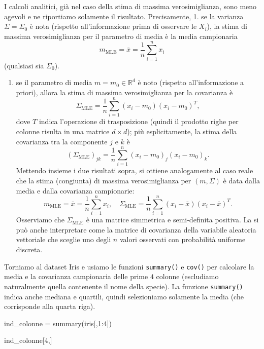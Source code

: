 \documentclass[
  italian,
  letterpaper,
]{book}
\newenvironment{Shaded}{\begin{snugshade}}{\end{snugshade}}
\newcommand{\DecValTok}[1]{\textcolor[rgb]{0.68,0.00,0.00}{#1}}
\newcommand{\FunctionTok}[1]{\textcolor[rgb]{0.28,0.35,0.67}{#1}}
\newcommand{\NormalTok}[1]{\textcolor[rgb]{0.00,0.23,0.31}{#1}}
\newcommand{\OtherTok}[1]{\textcolor[rgb]{0.00,0.23,0.31}{#1}}
\newcommand{\SpecialCharTok}[1]{\textcolor[rgb]{0.37,0.37,0.37}{#1}}
\providecommand{\tightlist}{%
  \setlength{\itemsep}{0pt}\setlength{\parskip}{0pt}}
\newcommand{\R}{\mathbb{R}}
\newcommand{\mle}{\operatorname{MLE}}
\theoremstyle{definition}
\theoremstyle{remark}
\begin{document}
I calcoli analitici, già nel caso della stima di massima
verosimiglianza, sono meno agevoli e ne riportiamo solamente il
risultato. Precisamente, 1. se la varianza \(\Sigma = \Sigma_0\) è nota
(rispetto all'informazione prima di osservare le \(X_i\)), la stima di
massima verosimiglianza per il parametro di media è la media campionaria
\[ m_{{\mle}} = \bar{x} = \frac{1}{n} \sum_{i=1}^n x_i\] (qualsiasi sia
\(\Sigma_0\)).

\begin{enumerate}
\def\labelenumi{\arabic{enumi}.}
\setcounter{enumi}{1}
\tightlist
\item
  se il parametro di media \(m = m_0\in \R^d\) è noto (rispetto
  all'informazione a priori), allora la stima di massima verosimiglianza
  per la covarianza è
  \[ \Sigma_{{\mle}} = \frac 1 n \sum_{i=1}^n(x_i-m_0)(x_i-m_0)^T,\]
  dove \(T\) indica l'operazione di trasposizione (quindi il prodotto
  righe per colonne risulta in una matrice \(d\times d\)); più
  esplicitamente, la stima della covarianza tra la componente \(j\) e
  \(k\) è
  \[ (\Sigma_{{\mle}})_{jk} = \frac 1 n \sum_{i=1}^n(x_i-m_0)_j (x_i-m_0)_k.\]
  Mettendo insieme i due risultati sopra, si ottiene analogamente al
  caso reale che la stima (congiunta) di massima verosimiglianza per
  \((m,\Sigma)\) è data dalla media e dalla covarianza campionarie:
  \[ m_{{\mle}} = \bar{x} = \frac{1}{n} \sum_{i=1}^n x_i,  \quad \Sigma_{{\mle}} = \frac 1 n \sum_{i=1}^n(x_i-\bar{x})(x_i-\bar{x})^T.\]
  Osserviamo che \(\Sigma_{\mle}\) è una matrice simmetrica e
  semi-definita positiva. La si può anche interpretare come la matrice
  di covarianza della variabile aleatoria vettoriale che sceglie uno
  degli \(n\) valori osservati con probabilità uniforme discreta.
\end{enumerate}

Torniamo al dataset Iris e usiamo le funzioni \texttt{summary()} e
\texttt{cov()} per calcolare la media e la covarianza campionaria delle
prime \(4\) colonne (escludiamo naturalmente quella contenente il nome
della specie). La funzione \texttt{summary()} indica anche mediana e
quartili, quindi selezioniamo solamente la media (che corrisponde alla
quarta riga).

\begin{Shaded}
\begin{Highlighting}[]
\NormalTok{ind\_colonne }\OtherTok{=} \FunctionTok{summary}\NormalTok{(iris[,}\DecValTok{1}\SpecialCharTok{:}\DecValTok{4}\NormalTok{])}

\NormalTok{ind\_colonne[}\DecValTok{4}\NormalTok{,]}
\end{Highlighting}
\end{Shaded}
\end{document}
